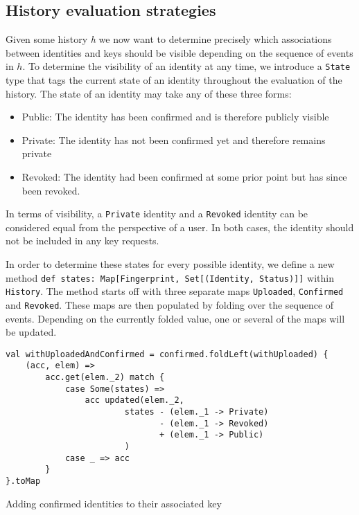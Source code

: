 \subsection{History evaluation strategies}
Given some history \emph{h} we now want to determine precisely which associations between identities and keys should be visible depending on the sequence of events in \(h\).
To determine the visibility of an identity at any time, we introduce a \texttt{State} type that tags the current state of an identity throughout the evaluation of the history.
The state of an identity may take any of these three forms: 
\begin{itemize}
    \item Public: The identity has been confirmed and is therefore publicly visible
    \item Private: The identity has not been confirmed yet and therefore remains private
    \item Revoked: The identity had been confirmed at some prior point but has since been revoked.
\end{itemize}
In terms of visibility, a \texttt{Private} identity and a \texttt{Revoked} identity can be considered equal from the perspective of a user. In both cases, the identity should not be included in any key requests.

In order to determine these states for every possible identity, we define a new method \texttt{def states: Map[Fingerprint, Set[(Identity, Status)]]} within \texttt{History}.
The method starts off with three separate maps \texttt{Uploaded}, \texttt{Confirmed} and \texttt{Revoked}. These maps are then populated by folding over the sequence of events.
Depending on the currently folded value, one or several of the maps will be updated. 

\begin{code}
    \begin{verbatim}
val withUploadedAndConfirmed = confirmed.foldLeft(withUploaded) { 
    (acc, elem) =>
        acc.get(elem._2) match {
            case Some(states) =>
                acc updated(elem._2, 
                        states - (elem._1 -> Private) 
                               - (elem._1 -> Revoked) 
                               + (elem._1 -> Public)
                        )
            case _ => acc
        }
}.toMap
    \end{verbatim}
    \caption{Adding confirmed identities to their associated key}
\end{code}


